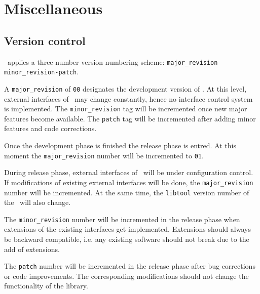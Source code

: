 \documentclass{article}[12pt,a4]
\begin{document}
\section{Miscellaneous}

\subsection{Version control}

\this\ applies a three-number version numbering scheme:
{\tt major\_revision-minor\_revision-patch}.

A {\tt major\_revision} of {\tt 00} designates the development version of \this.
At this level, external interfaces of \this\ may change constantly, hence no
interface control system is implemented.
The {\tt minor\_revision} tag will be incremented once new major features become
available.
The {\tt patch} tag will be incremented after adding minor features and code corrections.

Once the development phase is finished the release phase is entred.
At this moment the {\tt major\_revision} number will be incremented to {\tt 01}.

During release phase, external interfaces of \this\ will be under configuration control.
If modifications of existing external interfaces will be done, the {\tt major\_revision}
number will be incremented.
At the same time, the {\tt libtool} version number of the \this\ will also change.

The {\tt minor\_revision} number will be incremented in the release phase when
extensions of the existing interfaces get implemented.
Extensions should always be backward compatible, i.e. any existing software should
not break due to the add of extensions.

The {\tt patch} number will be incremented in the release phase after bug corrections
or code improvements.
The corresponding modifications should not change the functionality of the library.
\end{document}
